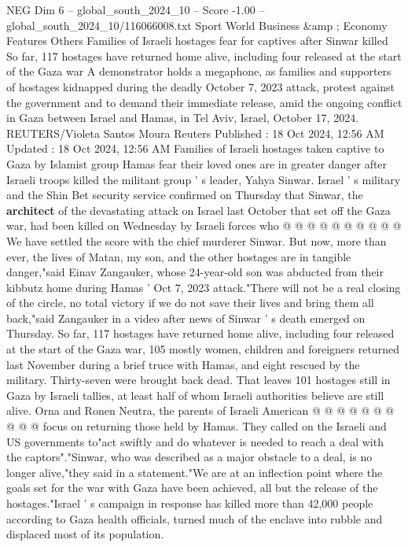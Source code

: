 \begin{textsample}{NEG Dim 6 – global\_south\_2024\_10 – Score -1.00 – global\_south\_2024\_10/116066008.txt}  \label{ex:f6_neg_035}
Sport World Business \&amp ; Economy Features Others Families of Israeli hostages fear for captives after Sinwar killed So far, 117 hostages have returned home alive, including four released at the start of the Gaza war A demonstrator holds a megaphone, as families and supporters of hostages kidnapped during the deadly October 7, 2023 attack, protest against the government and to demand their immediate release, amid the ongoing conflict in Gaza between Israel and Hamas, in Tel Aviv, Israel, October 17, 2024.
REUTERS/Violeta Santos Moura Reuters Published : 18 Oct 2024, 12:56 AM Updated : 18 Oct 2024, 12:56 AM Families of Israeli hostages taken captive to Gaza by Islamist group Hamas fear their loved ones are in greater danger after Israeli troops killed the militant group ' s leader, Yahya Sinwar.
Israel ' s military and the Shin Bet security service confirmed on Thursday that Sinwar, the \textbf{architect} of the devastating attack on Israel last October that set off the Gaza war, had been killed on Wednesday by Israeli forces who @ @ @ @ @ @ @ @ @ @ We have settled the score with the chief murderer Sinwar.
But now, more than ever, the lives of Matan, my son, and the other hostages are in tangible danger,"said Einav Zangauker, whose 24-year-old son was abducted from their kibbutz home during Hamas ' Oct 7, 2023 attack."There will not be a real closing of the circle, no total victory if we do not save their lives and bring them all back,"said Zangauker in a video after news of Sinwar ' s death emerged on Thursday.
So far, 117 hostages have returned home alive, including four released at the start of the Gaza war, 105 mostly women, children and foreigners returned last November during a brief truce with Hamas, and eight rescued by the military.
Thirty-seven were brought back dead.
That leaves 101 hostages still in Gaza by Israeli tallies, at least half of whom Israeli authorities believe are still alive.
Orna and Ronen Neutra, the parents of Israeli American @ @ @ @ @ @ @ @ @ @ focus on returning those held by Hamas.
They called on the Israeli and US governments to"act swiftly and do whatever is needed to reach a deal with the captors"."Sinwar, who was described as a major obstacle to a deal, is no longer alive,"they said in a statement."We are at an inflection point where the goals set for the war with Gaza have been achieved, all but the release of the hostages."Israel ' s campaign in response has killed more than 42,000 people according to Gaza health officials, turned much of the enclave into rubble and displaced most of its population.

\end{textsample}
